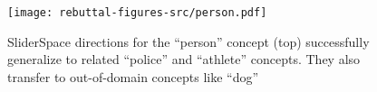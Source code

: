 \begin{figure}[!ht]
    \centering
    \texttt{[image: rebuttal-figures-src/person.pdf]}
    \vspace{-1.5em}
    \caption{SliderSpace directions for the ``person'' concept (top) successfully generalize to related ``police'' and ``athlete'' concepts. They also transfer to out-of-domain concepts like ``dog''}
    \vspace{-0.5em}
    \label{fig:reb-person}
\end{figure}
